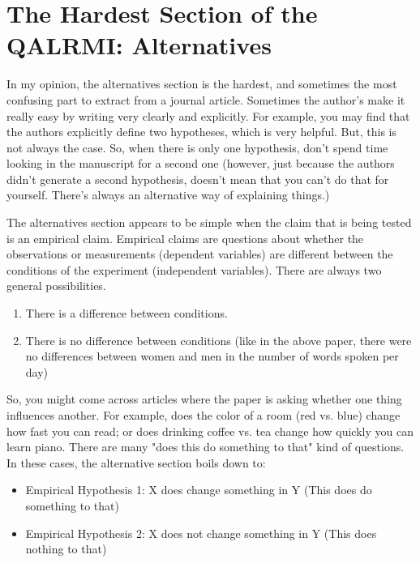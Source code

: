 \section{The Hardest Section of the QALRMI: Alternatives}

In my opinion, the alternatives section is the hardest, and sometimes the most confusing part to extract from a journal article. Sometimes the author's make it really easy by writing very clearly and explicitly. For example, you may find that the authors explicitly define two hypotheses, which is very helpful. But, this is not always the case. So, when there is only one hypothesis, don't spend time looking in the manuscript for a second one (however, just because the authors didn't generate a second hypothesis, doesn't mean that you can't do that for yourself. There's always an alternative way of explaining things.)

The alternatives section appears to be simple when the claim that is being tested is an empirical claim. Empirical claims are questions about whether the observations or measurements (dependent variables) are different between the conditions of the experiment (independent variables). There are always two general possibilities. 

\begin{enumerate}
\item There is a difference between conditions.
\item There is no difference between conditions (like in the above paper, there were no differences between women and men in the number of words spoken per day)
\end{enumerate}

So, you might come across articles where the paper is asking whether one thing influences another. For example, does the color of a room (red vs. blue) change how fast you can read; or does drinking coffee vs. tea change how quickly you can learn piano.  There are many "does this do something to that" kind of questions. In these cases, the alternative section boils down to:


\begin{itemize}
\item Empirical Hypothesis 1: X does change something in Y (This does do something to that)
\item Empirical Hypothesis 2: X does not change something in Y (This does nothing to that)
\end{itemize}

